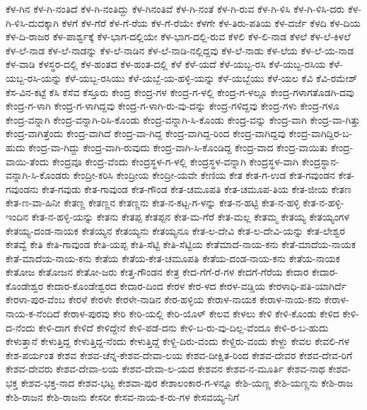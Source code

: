 ಕೆಳ-ಗಿನ
ಕೆಳ-ಗಿ-ನಂತಿದೆ
ಕೆಳ-ಗಿ-ನಂತಿದ್ದು
ಕೆಳ-ಗಿನಂತಿವೆ
ಕೆಳ-ಗಿ-ನಂತೆ
ಕೆಳ-ಗಿ-ರುವ
ಕೆಳ-ಗಿ-ಳಿಸಿ
ಕೆಳ-ಗಿ-ಳಿಸಿ-ದರು
ಕೆಳ-ಗಿ-ಳಿಸಿ-ದುದಕ್ಕಾಗಿ
ಕೆಳಗೆ
ಕೆಳ-ಗೆರೆ
ಕೆಳ-ಗೆ-ರೆಯ
ಕೆಳ-ಗೆ-ರೆಯೇ
ಕೆಳಗೇ
ಕೆಳ-ತಿರು-ಪತಿಯ
ಕೆಳ-ದರ್ಜೆ
ಕೆಳದಿ
ಕೆಳ-ದಿಯ
ಕೆಳ-ದಿ-ರಾಜರ
ಕೆಳ-ಪಾರ್ಶ್ವಕ್ಕೆ
ಕೆಳ-ಭಾಗ-ದಲ್ಲಿಯೇ
ಕೆಳ-ಭಾಗ-ದಲ್ಲಿ-ರುವ
ಕೆಳಲಿ
ಕೆಳ-ಲಿ-ನಾಡ
ಕೆಳಲೆ
ಕೆಳ-ಲೆ-ಕಿಳಲೆ
ಕೆಳ-ಲೆ-ನಾಡ
ಕೆಳ-ಲೆ-ನಾಡನ್ನು
ಕೆಳ-ಲೆ-ನಾಡಿನ
ಕೆಳ-ಲೆ-ನಾಡಿ-ನಲ್ಲಿದ್ದವು
ಕೆಳ-ಲೆ-ನಾಡು
ಕೆಳ-ಲೆಯ
ಕೆಳ-ಲೆ-ಯ-ನಾಡ
ಕೆಳ-ವಾಡಿ
ಕೆಳಸ್ಥರ-ದಲ್ಲಿ
ಕೆಳ-ಹಂತದ
ಕೆಳ-ಹಂತ-ದಲ್ಲಿ
ಕೆಳೆ
ಕೆಳೆ-ಯದೆ
ಕೆಳೆ-ಯಬ್ಬ-ರಸಿ
ಕೆಳೆ-ಯಬ್ಬ-ರಸಿಯ
ಕೆಳೆ-ಯಬ್ಬ-ರಸಿ-ಯನ್ನು
ಕೆಳೆ-ಯಬ್ಬ-ರಸಿಯು
ಕೆಳೆ-ಯಬ್ಬೆ-ಯ-ಹಳ್ಳಿ-ಯನ್ನು
ಕೆಳೆ-ಯಬ್ಬೆಯು
ಕೆಳೆ-ಯಲ
ಕೆವಿ
ಕೆವಿ-ರಮೇಶ್
ಕೆಸ-ವಿನ-ಕಟ್ಟೆ
ಕೆಸಿ
ಕೆಸೆವ
ಕೆಸ್ತೂರು
ಕೇಂದ್ರ
ಕೇಂದ್ರ-ಗಳ
ಕೇಂದ್ರ-ಗ-ಳಲ್ಲಿ
ಕೇಂದ್ರ-ಗ-ಳಲ್ಲೂ
ಕೇಂದ್ರ-ಗಳಾಗತೊಡಗಿ-ದವು
ಕೇಂದ್ರ-ಗ-ಳಾಗಿ
ಕೇಂದ್ರ-ಗ-ಳಾಗಿದ್ದವು
ಕೇಂದ್ರ-ಗ-ಳಾಗಿ-ರು-ವು-ದನ್ನು
ಕೇಂದ್ರ-ಗಳಿದ್ದವು
ಕೇಂದ್ರ-ಗಳು
ಕೇಂದ್ರ-ಗಳೂ
ಕೇಂದ್ರ-ವನ್ನಾಗಿ
ಕೇಂದ್ರ-ವನ್ನಾಗಿ-ರಿಸಿ-ಕೊಂಡು
ಕೇಂದ್ರ-ವನ್ನಾಗಿ-ಸಿ-ಕೊಂಡು
ಕೇಂದ್ರ-ವನ್ನು
ಕೇಂದ್ರ-ವಾಗಿ
ಕೇಂದ್ರ-ವಾ-ಗಿತ್ತು
ಕೇಂದ್ರ-ವಾಗಿತ್ತೆಂದು
ಕೇಂದ್ರ-ವಾಗಿದೆ
ಕೇಂದ್ರ-ವಾ-ಗಿದ್ದ
ಕೇಂದ್ರ-ವಾಗಿದ್ದ-ರಿಂದ
ಕೇಂದ್ರ-ವಾಗಿದ್ದವು
ಕೇಂದ್ರ-ವಾಗಿದ್ದಿರ-ಬ-ಹುದು
ಕೇಂದ್ರ-ವಾ-ಗಿದ್ದು
ಕೇಂದ್ರ-ವಾಗಿ-ರುವುದು
ಕೇಂದ್ರ-ವಾಗಿ-ಸಿ-ಕೊಂಡಿದ್ದ
ಕೇಂದ್ರ-ವಾದ
ಕೇಂದ್ರ-ವಾಯಿತು
ಕೇಂದ್ರ-ವಾಯಿ-ತೆಂದು
ಕೇಂದ್ರವೂ
ಕೇಂದ್ರ-ವೆಂದು
ಕೇಂದ್ರಸ್ಥಳ-ಗ-ಳಲ್ಲಿ
ಕೇಂದ್ರಸ್ಥಳ-ವನ್ನಾಗಿ
ಕೇಂದ್ರಸ್ಥಳ-ವಾಗಿ
ಕೇಂದ್ರಸ್ಥಾನ-ವನ್ನಾಗಿ-ಸಿ-ಕೊಂಡರು
ಕೇಂದ್ರೀ-ಕರಿಸಿ
ಕೇಂದ್ರೀಯ
ಕೇಂದ್ರೀ-ಯವೇ
ಕೇಣಿಯ
ಕೇತ
ಕೇತ-ಗ-ಉಡ
ಕೇತ-ಗವುಂಡನ
ಕೇತ-ಗವುಂಡನು
ಕೇತ-ಗವುಡು
ಕೇತ-ಗಾವುಂಡ
ಕೇತ-ಗೌಂಡ
ಕೇತ-ಚಮೂಪತಿ
ಕೇತ-ಚಮೂಪ-ತಿಯ
ಕೇತ-ಜೀಯ
ಕೇತಣ
ಕೇತ-ಣ-ವಾ-ಹಿನೀ
ಕೇತಣ್ಣ
ಕೇತಣ್ಣನ
ಕೇತಣ್ಣನು
ಕೇತ-ನ-ಕಟ್ಟ-ಗ-ಳನ್ನು
ಕೇತ-ನ-ಹಟ್ಟಿ
ಕೇತ-ನ-ಹಳ್ಳಿ
ಕೇತ-ನ-ಹಳ್ಳಿ-ಇಂದಿನ
ಕೇತ-ನ-ಹಳ್ಳಿ-ಯನ್ನು
ಕೇತನು
ಕೇತಪ್ಪ
ಕೇತಪ್ಪನ
ಕೇತ-ಮ-ಗೆರೆ
ಕೇತ-ಮಲ್ಲ
ಕೇತಮ್ಮ
ಕೇತಯ್ಯ
ಕೇತಯ್ಯಂಗಳ
ಕೇತಯ್ಯ-ದಂಡ-ನಾಯಕ
ಕೇತಯ್ಯನ
ಕೇತಯ್ಯನು
ಕೇತಯ್ಯನೂ
ಕೇತ-ಲ-ದೇವಿ
ಕೇತ-ಲ-ದೇವಿ-ಯನ್ನು
ಕೇತ-ಲೇಶ್ವರ
ಕೇತವ್ವೆ
ಕೇತಿ
ಕೇತಿ-ಗಾವುಂಡ
ಕೇತಿ-ಯಪ್ಪ
ಕೇತಿ-ಸೆಟ್ಟಿ
ಕೇತಿ-ಸೆಟ್ಟಿಯ
ಕೇತೆಮಾದೆ-ನಾಯ-ಕನು
ಕೇತೆ-ಮಾದೆಯ-ನಾಯಕ
ಕೇತೆ-ಮಾದೆಯ-ನಾಯ-ಕನು
ಕೇತೆಯ
ಕೇತೆಯ-ಕೇತ-ಚಮೂಪತಿ
ಕೇತೆಯ-ದಂಡ-ನಾಯ-ಕನು
ಕೇತೆಯ-ನಾಯಕ
ಕೇತೋಜ
ಕೇತೋಜನ
ಕೇತೋ-ಜರು
ಕೇತ್ತ-ಗೌಂಡನ
ಕೇತ್ರ
ಕೇದ-ಗೆಗೆ-ರೆ-ಗಳ
ಕೇದಗೆ-ಗೆರೆಯ
ಕೇದಾರ
ಕೇದಾರ-ಕೊಂಡೇಶ್ವರ
ಕೇದಾರ-ಕೊಂಡೇಶ್ವರದ
ಕೇದಾರ-ದಿಂದ
ಕೇರಳ
ಕೇರ-ಳದ
ಕೇರಳ-ವಡ್ಡಿಯ
ಕೇರಳಾಧಿ-ಪತಿ-ಯಾಗಿರ್ದೆ
ಕೇರಳಾ-ಪುರ-ವೆಂಬ
ಕೇರಳೆ
ಕೇರಳೇ
ಕೇರಳೇ-ನಾಡಿನ
ಕೇರ-ಹಳ್ಳಿಯ
ಕೇರಾಳ-ನಾಯಕ
ಕೇರಾಳ-ನಾಯ-ಕನು
ಕೇರಾಳ-ನಾಯ-ಕ-ನೆಂದಿದೆ
ಕೇರಾಳ-ಪುರವು
ಕೇರಿ
ಕೇರಿ-ಯಲ್ಲಿ
ಕೇರಿ-ಯೊಳ್
ಕೇಲವ
ಕೇಳಲು
ಕೇಳಿ
ಕೇಳಿ-ಕೊಂಡು
ಕೇಳಿದ
ಕೇಳಿ-ದ-ನೆಂದು
ಕೇಳಿ-ದಾಗ
ಕೇಳಿದೆ
ಕೇಳಿದ್ದೇನೆ
ಕೇಳಿ-ಪಡೆ-ದನು
ಕೇಳಿ-ಬ-ರು-ವು-ದಿಲ್ಲ-ವೆಂದೂ
ಕೇಳಿ-ರ-ಬ-ಹುದು
ಕೇಳುತ್ತಾನೆ
ಕೇಳುತ್ತಿದ್ದ
ಕೇಳುತ್ತಿದ್ದ-ನೆಂದು
ಕೇಳುತ್ತಿದ್ದೆ
ಕೇಳ್ದಿ-ದಿರು-ವಂದು
ಕೇಳ್ದಿರು-ವಂದು
ಕೇಳ್ದು
ಕೇವಲ
ಕೇವಲಿ-ಗಳ
ಕೇಶ-ಪರ್ಯಂತ
ಕೇಶವ
ಕೇಶವ-ಚೆನ್ನ-ಕೇಶವ-ದೇವಾ-ಲಯ
ಕೇಶವ-ದೀಕ್ಷಿತ-ರಿಂದ
ಕೇಶವ-ದೇವರ
ಕೇಶವ-ದೇವ-ರಿಗೆ
ಕೇಶವ-ದೇವರು
ಕೇಶವ-ದೇವಾ-ಲಯ
ಕೇಶವ-ದೇವಾ-ಲ-ಯದ
ಕೇಶವನ
ಕೇಶವ-ನ-ಮೂರ್ತಿ
ಕೇಶವ-ನಾಥ
ಕೇಶವ-ಭಕ್ತ
ಕೇಶವ-ಭಕ್ತ-ನಾದ
ಕೇಶವ-ಭಟ್ಟ
ಕೇಶವಾ-ಪುರ
ಕೇಶಾಲಂಕಾರ-ಗ-ಳನ್ನೂ
ಕೇಶಿ-ಯಣ್ಣ
ಕೇಶಿ-ಯಣ್ಣನು
ಕೇಶಿ-ರಾಜ
ಕೇಶಿ-ರಾಜನ
ಕೇಶಿ-ರಾಜನು
ಕೇಸರೀ
ಕೇಸವ-ನಾಯ-ಕ-ರು-ಗಳ
ಕೇಸವಯ್ಯ-ನಿಗೆ
